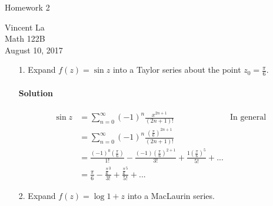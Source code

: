 \documentclass[11pt]{article}
\title{ }
\begin{document}
	\begin{center}	%
		\Large{Homework 2}	%
	\end{center}
	\begin{center}
		Vincent La \\
		Math 122B \\
		August 10, 2017
	\end{center}
	
	\begin{enumerate}
		\item[1.] Expand $f(z) = \sin{z}$ into a Taylor series about the point $z_0 = \frac{\pi}{6}$.
		\paragraph{Solution}
		\[\begin{aligned}
		\sin{z}
		&= \sum^{\infty}_{n=0} (-1)^n \frac{x^{2n+1}}{(2n+1)!} &\text{In general} \\
		&= \sum^{\infty}_{n=0} (-1)^n \frac{(\frac{\pi}{6})^{2n+1}}{(2n+1)!} \\
		&= \frac{(-1)^0(\frac{\pi}{6})}{1!} - \frac{(-1)(\frac{\pi}{6})^{2+1}}{3!} +
		   \frac{1(\frac{\pi}{6})^5}{5!} + ... \\
		&= \frac{\pi}{6} - \frac{\frac{\pi}{6}^3}{3!} + \frac{\frac{\pi}{6}^5}{5!} + ...
		\end{aligned}\]
		
		\item[2.] Expand $f(z) = \log{1 + z}$ into a MacLaurin series.

\end{enumerate}
\end{document}
